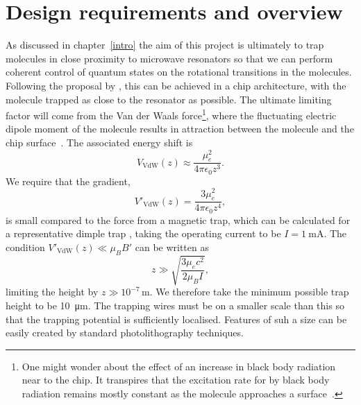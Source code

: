 \section{Design requirements and overview}
\label{overview:design}

As discussed in chapter~\ref{intro} the aim of this project is ultimately to
trap molecules in close proximity to microwave resonators so that we can
perform coherent control of quantum states on the rotational transitions in the
molecules.
%
Following the proposal by , this can be achieved in a chip
architecture, with the molecule trapped as close to the resonator as possible.
%
The ultimate limiting factor will come from the Van der Waals force\footnote{
  One might wonder about the effect of an increase in black body radiation near
  to the chip.  It transpires that the excitation rate for \CaF{} by black body
  radiation remains mostly constant as the molecule approaches a
  surface~\cite{PhysRevA.78.052901}.
}, where the fluctuating electric dipole moment of the molecule results in
attraction between the molecule and the chip surface~\cite{2011Ac}. The
associated energy shift is 
%
\begin{equation}
  V_\text{VdW}(z) \approx \frac{\mu_e^2}{4\pi\epsilon_0 z^3}.
\end{equation}
%
We require that the gradient,
%
\begin{equation}
V'_\text{VdW}(z) = \frac{3 \mu_e^2}{4 \pi\epsilon_0 z^4},
\end{equation}
%
is small compared to the force from a magnetic trap, which can be calculated
for a representative dimple trap , taking the
operating current to be $I = \SI{1}{\milli\ampere}$. The condition
$V'_\text{VdW}(z) \ll \mu_B B'$ can be written as
%
\begin{equation}
  z \gg \sqrt{\frac{3 \mu_e c^2}{2 \mu_B I}},
\end{equation}
%
limiting the height by $z \gg 10^{-7}\,\si{\meter}$. We therefore take the
minimum possible trap height to be \SI{10}{\micro\meter}. The trapping wires
must be on a smaller scale than this so that the trapping potential is
sufficiently localised. Features of suh a size can be easily created by
standard photolithography techniques.


